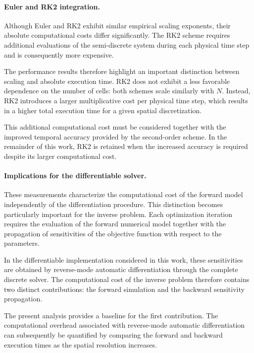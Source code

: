 \documentclass[11pt,a4paper]{report}
\theoremstyle{plain}
\theoremstyle{definition}
\begin{document}
\paragraph{Euler and RK2 integration.}

Although Euler and RK2 exhibit similar empirical scaling exponents, their
absolute computational costs differ significantly. The RK2 scheme requires
additional evaluations of the semi-discrete system during each physical time
step and is consequently more expensive.

The performance results therefore highlight an important distinction between
scaling and absolute execution time. RK2 does not exhibit a less favorable
dependence on the number of cells: both schemes scale similarly with $N$.
Instead, RK2 introduces a larger multiplicative cost per physical time step,
which results in a higher total execution time for a given spatial
discretization.

This additional computational cost must be considered together with the
improved temporal accuracy provided by the second-order scheme. In the
remainder of this work, RK2 is retained when the increased accuracy is
required despite its larger computational cost.


\paragraph{Implications for the differentiable solver.}

These measurements characterize the computational cost of the forward model
independently of the differentiation procedure. This distinction becomes
particularly important for the inverse problem. Each optimization iteration
requires the evaluation of the forward numerical model together with the
propagation of sensitivities of the objective function with respect to the
parameters.

In the differentiable implementation considered in this work, these
sensitivities are obtained by reverse-mode automatic differentiation through
the complete discrete solver. The computational cost of the inverse problem
therefore contains two distinct contributions: the forward simulation and the
backward sensitivity propagation.

The present analysis provides a baseline for the first contribution. The
computational overhead associated with reverse-mode automatic differentiation
can subsequently be quantified by comparing the forward and backward execution
times as the spatial resolution increases.
\end{document}
